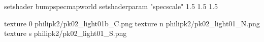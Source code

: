 setshader bumpspecmapworld
setshaderparam "specscale" 1.5 1.5 1.5

texture 0 philipk2/pk02_light01b_C.png
texture n philipk2/pk02_light01_N.png
texture s philipk2/pk02_light01_S.png

